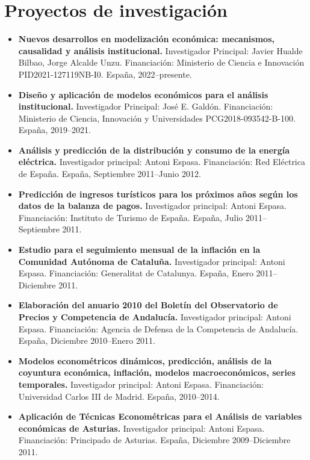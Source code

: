 \documentclass[11pt]{article}\usepackage[]{graphicx}\usepackage[usenames,dvipsnames]{xcolor}
\begin{document}
\section{Proyectos de investigación} 

\begin{itemize}
  \item \textbf{Nuevos desarrollos en modelización económica: mecanismos, causalidad y análisis institucional.} Investigador Principal: Javier Hualde Bilbao, Jorge Alcalde Unzu. Financiación: Ministerio de Ciencia e Innovación PID2021-127119NB-I0. España, 2022--presente.

  \item \textbf{Diseño y aplicación de modelos económicos para el análisis institucional.} Investigador Principal: José E. Galdón. Financiación: Ministerio de Ciencia, Innovación y Universidades PCG2018-093542-B-100. España, 2019--2021.

\item \textbf{Análisis y predicción de la distribución y consumo de la energía eléctrica.} Investigador principal: Antoni Espasa. Financiación: Red Eléctrica de España. España, Septiembre 2011--Junio 2012.

\item \textbf{Predicción de ingresos turísticos para los próximos años según los datos de la balanza de pagos.} Investigador principal: Antoni Espasa. Financiación: Instituto de Turismo de España. España, Julio 2011--Septiembre 2011.

\item \textbf{Estudio para el seguimiento mensual de la inflación en la Comunidad Autónoma de Cataluña.} Investigador principal: Antoni Espasa. Financiación: Generalitat de Catalunya. España, Enero 2011--Diciembre 2011.

\item \textbf{Elaboración del anuario 2010 del Boletín del Observatorio de Precios y Competencia de Andalucía.} Investigador principal: Antoni Espasa. Financiación: Agencia de Defensa de la Competencia de Andalucía. España, Diciembre 2010--Enero 2011.

\item \textbf{Modelos econométricos dinámicos, predicción, análisis de la
coyuntura económica, inflación, modelos macroeconómicos, series temporales.} Investigador principal: Antoni Espasa. Financiación: Universidad Carlos III de Madrid. España, 2010--2014.

\item \textbf{Aplicación de Técnicas Econométricas para el Análisis de variables económicas de Asturias.} Investigador principal: Antoni Espasa. Financiación: Principado de Asturias. España, Diciembre 2009--Diciembre 2011.


\end{itemize}
\end{document}
